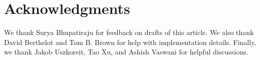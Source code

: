 \documentclass{article}
\begin{document}
\section*{Acknowledgments}
We thank Surya Bhupatiraju for feedback on drafts of this article. We also thank David Berthelot and Tom B. Brown for help with implementation details. Finally, we thank Jakob Uszkoreit, Tao Xu, and Ashish Vaswani for helpful discussions.





\nocite{langley00}



\end{document}
